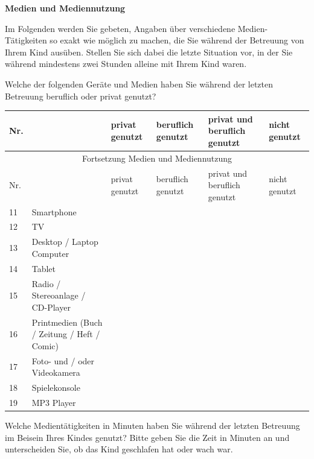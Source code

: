 \begin{flushleft}
\begin{longtable}[c]{ |p{1em}|p{16em}|p{16em}| }
\end{longtable}

\bigskip
\textbf{Medien und Mediennutzung}

Im Folgenden werden Sie gebeten, Angaben über verschiedene Medien-Tätigkeiten so exakt wie möglich zu machen, die Sie während der Betreuung von Ihrem Kind ausüben. Stellen Sie sich dabei die letzte Situation vor, in der Sie während mindestens zwei Stunden alleine mit Ihrem Kind waren.

\vspace{2mm}
Welche der folgenden Geräte und Medien haben Sie während der letzten Betreuung beruflich oder privat genutzt?

\begin{longtable}[c]{ |p{1em}|p{12em}|p{4em}|p{4em}|p{4em}|p{4em}|}
 
  \hline
  Nr. &  & privat genutzt & beruflich genutzt & privat und beruflich genutzt & nicht genutzt \\
  \hline
  \endfirsthead
 
  \hline
  \multicolumn{6}{|c|}{ Fortsetzung Medien und Mediennutzung}\\
  \hline
  Nr. &  & privat genutzt & beruflich genutzt & privat und beruflich genutzt & nicht genutzt \\
  \hline
  \endhead
 
  \hline
  \endfoot
 
  \hline\hline
  \endlastfoot
  
  
  11 & Smartphone &  &  &  &  \\
  12 & TV &  &  &  &  \\
  13 & Desktop / Laptop Computer &  &  &  &  \\
  14 & Tablet &  &  &  &  \\
  15 & Radio / Stereoanlage / CD-Player &  &  &  &  \\
  16 & Printmedien (Buch / Zeitung / Heft / Comic) &  &  &  &  \\
  17 & Foto- und / oder Videokamera &  &  &  &  \\
  18 & Spielekonsole &  &  &  &  \\
  19 & MP3 Player &  &  &  &  \\
  
\end{longtable}

Welche Medientätigkeiten in Minuten haben Sie während der letzten Betreuung im Beisein Ihres Kindes genutzt? Bitte geben Sie die Zeit in Minuten an und unterscheiden Sie, ob das Kind geschlafen hat oder wach war.


\end{flushleft}
